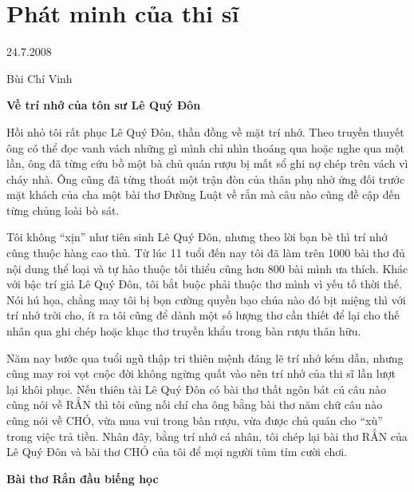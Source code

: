 \documentclass[../main.tex]{subfiles}
\begin{document}
\chapter{Phát minh của thi sĩ}

\begin{metadata}

\begin{flushright}24.7.2008\end{flushright}

Bùi Chí Vinh



\end{metadata}

\begin{multicols}{2}

\textbf{Về trí nhớ của tôn sư Lê Quý Ðôn} 
 
Hồi nhỏ tôi rất phục Lê Quý Ðôn, thần đồng về mặt trí nhớ. Theo truyền thuyết ông có thể đọc vanh vách những gì mình chỉ nhìn thoáng qua hoặc nghe qua một lần, ông đã từng cứu bồ một bà chủ quán rượu bị mất sổ ghi nợ chép trên vách vì cháy nhà. Ông cũng đã từng thoát một trận đòn của thân phụ nhờ ứng đối trước mặt khách của cha một bài thơ Ðường Luật về rắn mà câu nào cũng đề cập đến từng chủng loài bò sát. 
 
Tôi không “xịn” như tiên sinh Lê Quý Ðôn, nhưng theo lời bạn bè thì trí nhớ cũng thuộc hàng cao thủ. Từ lúc 11 tuổi đến nay tôi đã làm trên 1000 bài thơ đủ nội dung thể loại và tự hào thuộc tối thiểu cũng hơn 800 bài mình ưa thích. Khác với bậc trí giả Lê Quý Ðôn, tôi bắt buộc phải thuộc thơ mình vì yếu tố thời thế. Nói hú họa, chẳng may tôi bị bọn cường quyền bạo chúa nào đó bịt miệng thì với trí nhớ trời cho, ít ra tôi cũng để dành một số lượng thơ cần thiết để lại cho thế nhân qua ghi chép hoặc khạc thơ truyền khẩu trong bàn rượu thân hữu. 
 
Năm nay bước qua tuổi ngũ thập tri thiên mệnh đáng lẽ trí nhớ kém dần, nhưng cũng may roi vọt cuộc đời không ngừng quất vào nên trí nhớ của thi sĩ lần lượt lại khôi phục. Nếu thiên tài Lê Quý Ðôn có bài thơ thất ngôn bát cú câu nào cũng nói về RẮN thì tôi cũng nối chí cha ông bằng bài thơ năm chữ câu nào cũng nói về CHÓ, vừa mua vui trong bàn rượu, vừa được chủ quán cho “xù” trong việc trả tiền. Nhân đây, bằng trí nhớ cá nhân, tôi chép lại bài thơ RẮN của Lê Quý Ðôn và bài thơ CHÓ của tôi để mọi người tủm tỉm cười chơi. 
\begin{blockquote}
 
\textbf{Bài thơ Rắn đầu biếng học} 
        

\end{blockquote}
\end{multicols}
\end{document}
